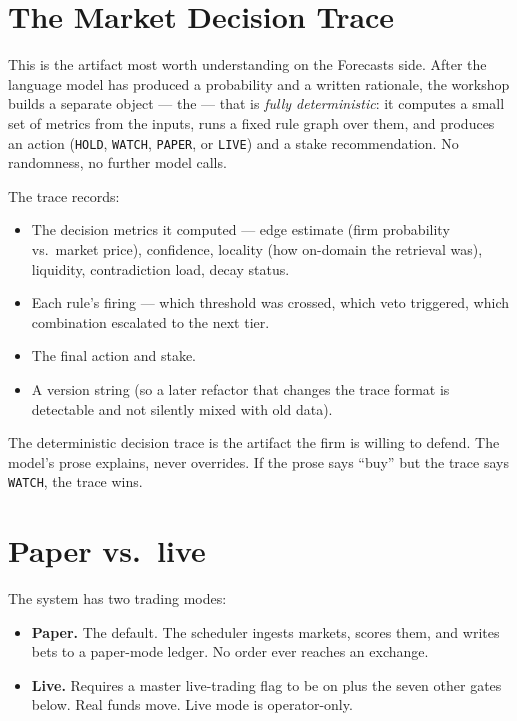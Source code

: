 \documentclass[11pt]{article}
\begin{document}
\section{The Market Decision Trace}

This is the artifact most worth understanding on the Forecasts side.
After the language model has produced a probability and a written
rationale, the workshop builds a separate object --- the  --- that is \emph{fully deterministic}: it computes a
small set of metrics from the inputs, runs a fixed rule graph over
them, and produces an action (\texttt{HOLD}, \texttt{WATCH},
\texttt{PAPER}, or \texttt{LIVE}) and a stake recommendation. No
randomness, no further model calls.

The trace records:

\begin{itemize}[leftmargin=*,itemsep=0.2em]
  \item The decision metrics it computed --- edge estimate (firm
        probability vs.\ market price), confidence, locality (how
        on-domain the retrieval was), liquidity, contradiction load,
        decay status.
  \item Each rule's firing --- which threshold was crossed, which
        veto triggered, which combination escalated to the next tier.
  \item The final action and stake.
  \item A version string (so a later refactor that changes the trace
        format is detectable and not silently mixed with old data).
\end{itemize}

The deterministic decision trace is the artifact the firm is willing
to defend. The model's prose explains, never overrides. If the prose
says ``buy'' but the trace says \texttt{WATCH}, the trace wins.


\section{Paper vs.\ live}

The system has two trading modes:

\begin{itemize}[leftmargin=*,itemsep=0.3em]
  \item \textbf{Paper.} The default. The scheduler ingests markets,
        scores them, and writes bets to a paper-mode ledger. No order
        ever reaches an exchange.
  \item \textbf{Live.} Requires a master live-trading flag to be on
        plus the seven other gates below. Real funds move. Live mode
        is operator-only.
\end{itemize}
\end{document}
